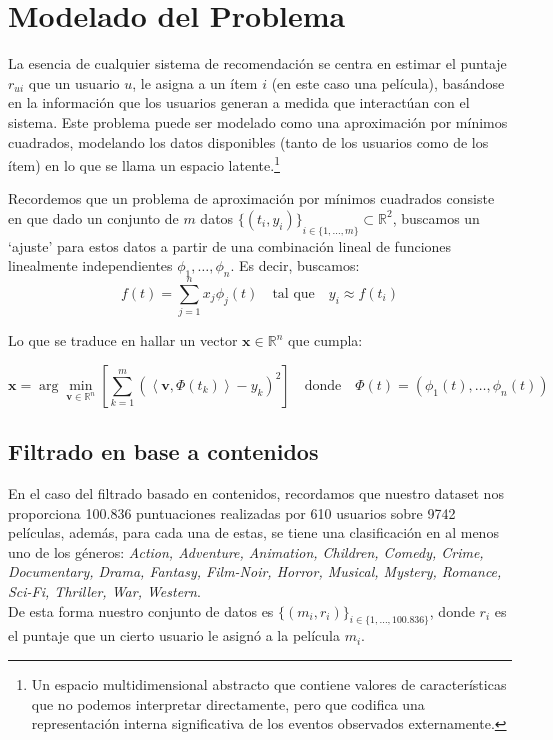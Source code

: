 \documentclass[12pt,a4paper]{article}
\begin{document}
\section*{Modelado del Problema}

La esencia de cualquier sistema de recomendación se centra en estimar el puntaje \(r_{ui}\) que un usuario \(u\), le asigna a un ítem \(i\) (en este caso una película), basándose en la información que los usuarios generan a medida que interactúan con el sistema.
Este problema puede ser modelado como una aproximación por mínimos cuadrados, modelando los datos disponibles (tanto de los usuarios como de los ítem) en lo que se llama un espacio latente.\footnote{Un espacio multidimensional abstracto que contiene valores de características que no podemos interpretar directamente, pero que codifica una representación interna significativa de los eventos observados externamente.}

Recordemos que un problema de aproximación por mínimos cuadrados consiste en que dado un conjunto de \(m\) datos \({\{(t_i, y_i)\}}_{ i \in \{1,\ldots, m\}} \subset \mathbb{R}^2\), buscamos un `ajuste' para estos datos a partir de una combinación lineal de funciones linealmente independientes \(\phi_1, \ldots, \phi_n\). Es decir, buscamos:
\[
  f(t) = \sum_{j=1}^{n} x_j \phi_j(t) \quad \text{tal que} \quad y_i \approx f(t_i)
\]

Lo que se traduce en hallar un vector \(\mathbf{x} \in \mathbb{R}^n\) que cumpla:

\[
  \mathbf{x} = \arg\min_{\mathbf{v} \in \mathbb{R}^n }  \left[ \sum_{k=1}^{m} (\left\langle \mathbf{v}, \Phi(t_k) \right\rangle - y_k)^2 \right] \quad \text{donde} \quad \Phi(t) = (\phi_1 (t), \ldots, \phi_n(t))
\]
\subsection*{Filtrado en base a contenidos}

En el caso del filtrado basado en contenidos, recordamos que nuestro dataset nos proporciona 100.836 puntuaciones realizadas por 610 usuarios sobre 9742 películas, además, para cada una de estas, se tiene una clasificación en al menos uno de los géneros: \textit{Action, Adventure, Animation, Children, Comedy, Crime, Documentary, Drama, Fantasy, Film-Noir, Horror, Musical, Mystery, Romance, Sci-Fi, Thriller, War, Western}.
\\

De esta forma nuestro conjunto de datos es \({\{(m_i, r_i)\}}_{ i \in \{1,\ldots, 100.836\}}\), donde \(r_i\) es el puntaje que un cierto usuario le asignó a la película \(m_i\).
\\
\end{document}
